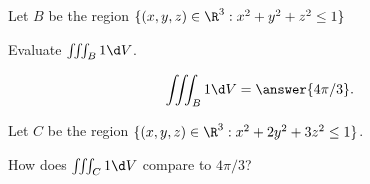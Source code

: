 \documentclass{ximera}
\author{Jim Fowler}
\begin{document}
\begin{exercise}
  Let $B$ be the region $\{ (x,y,z) \in \R^3 : x^2 + y^2 + z^2 \leq 1 \}$

  Evaluate $\iiint_B 1 \d V$.
  \begin{prompt}
    \[
      \iiint_B 1 \d V = \answer{4 \pi / 3}.
    \]    
  \end{prompt}

  \begin{exercise}
    Let $C$ be the region $\{ (x,y,z) \in \R^3 : x^2 + 2y^2 + 3z^2 \leq 1 \}$.

    How does $\iiint_C 1 \d V$ compare to $4 \pi / 3$?
    \begin{multipleChoice}
    \end{multipleChoice}
  \end{exercise}
  
\end{exercise}
\end{document}
